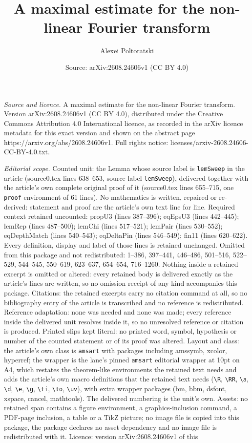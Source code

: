 \documentclass[10pt,a4paper]{amsart}
\title[A maximal estimate for the non-linear Fourier transform]{A maximal estimate for the non-linear Fourier transform}
\author{Alexei Poltoratski}
\date{Source: arXiv:2608.24606v1 (CC BY 4.0)}
\begin{document}
\maketitle

\noindent\emph{Source and licence.} A maximal estimate for the non-linear Fourier transform. Version arXiv:2608.24606v1 (CC BY 4.0), distributed under the Creative Commons Attribution 4.0 International licence, as recorded in the arXiv licence metadata for this exact version and shown on the abstract page https://arxiv.org/abs/2608.24606v1. Full rights notice: licenses/arxiv-2608.24606-CC-BY-4.0.txt.\par\smallskip

\noindent\textit{Editorial scope.} Counted unit: the Lemma whose source label is \texttt{lemSweep} in the article (source0.tex lines 638--653, source label \texttt{lemSweep}), delivered together with the article's own complete original proof of it (source0.tex lines 655--715, one \texttt{proof} environment of 61 lines). No mathematics is written, repaired or re-derived: statement and proof are the article's own text line for line. Required context retained uncounted: propU3 (lines 387--396); eqEpsU3 (lines 442--445); lemRep (lines 487--500); lemChi (lines 517--521); lemPair (lines 530--552); eqDepthMatch (lines 540--543); eqDeltaPin (lines 546--549); fin11 (lines 620--622). Every definition, display and label of those lines is retained unchanged. Omitted from this package and not redistributed: 1--386, 397--441, 446--486, 501--516, 522--529, 544--545, 550--619, 623--637, 654--654, 716--1260. Nothing inside a retained excerpt is omitted or altered: every retained body is delivered exactly as the article's lines are written, so no omission receipt of any kind accompanies this package. Citations: the retained excerpts carry no citation command at all, so no bibliography entry of the article is transcribed and no reference is redistributed. Reference adaptation: none was needed and none was made; every reference inside the delivered unit resolves inside it, so no unresolved reference or citation is produced. Printed slips kept literal: no printed word, symbol, hypothesis or number of the counted statement or of its proof was altered. Layout and class: the article's own class is \texttt{amsart} with packages including amssymb, xcolor, hyperref; the wrapper is the lane's pinned \texttt{amsart} editorial wrapper at 10pt on A4, which restates the theorem-like environments the retained text needs and adds the article's own macro definitions that the retained text needs (\texttt{\textbackslash R}, \texttt{\textbackslash RR}, \texttt{\textbackslash a}, \texttt{\textbackslash d}, \texttt{\textbackslash e}, \texttt{\textbackslash g}, \texttt{\textbackslash ti}, \texttt{\textbackslash to}, \texttt{\textbackslash uv}), with extra wrapper packages (bm, bbm, dsfont, xspace, cancel, mathtools). The delivered numbering is the unit's own. Assets: no retained span contains a figure environment, a graphics-inclusion command, a PDF-page inclusion, a table or a TikZ picture; no image file is copied into this package, the package declares no asset dependency and no image file is redistributed with it. Licence: version arXiv:2608.24606v1 of this 
\end{document}

